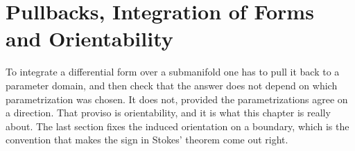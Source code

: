\chapter{Pullbacks, Integration of Forms and Orientability}
\label{ch:pullbacks}

To integrate a differential form over a submanifold one has to pull it back to a parameter
domain, and then check that the answer does not depend on which parametrization was chosen. It
does not, provided the parametrizations agree on a direction. That proviso is orientability, and
it is what this chapter is really about. The last section fixes the induced orientation on a boundary, which
is the convention that makes the sign in Stokes' theorem come out right.






